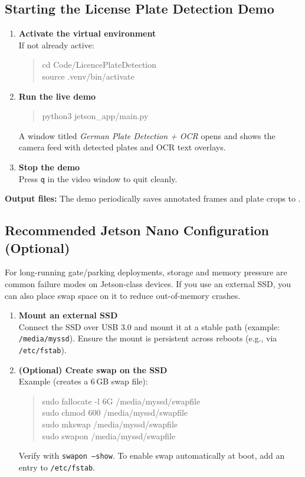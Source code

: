 \documentclass[11pt,a4paper]{article}
\begin{document}
\subsection{Starting the License Plate Detection Demo}
\begin{enumerate}
    \item \textbf{Activate the virtual environment}\\
    If not already active:
    \begin{quote}\ttfamily
    cd Code/LicencePlateDetection\\
    source .venv/bin/activate
    \end{quote}

    \item \textbf{Run the live demo}\\
    \begin{quote}\ttfamily
    python3 jetson\_app/main.py
    \end{quote}
    A window titled \textit{German Plate Detection + OCR} opens and shows the camera feed with detected plates and OCR text overlays.

    \item \textbf{Stop the demo}\\
    Press \texttt{q} in the video window to quit cleanly.
\end{enumerate}

\textbf{Output files:} The demo periodically saves annotated frames and plate crops to .

\subsection{Recommended Jetson Nano Configuration (Optional)}
For long-running gate/parking deployments, storage and memory pressure are common failure modes on Jetson-class devices.
If you use an external SSD, you can also place swap space on it to reduce out-of-memory crashes.

\begin{enumerate}
    \item \textbf{Mount an external SSD}\\
    Connect the SSD over USB 3.0 and mount it at a stable path (example: \texttt{/media/myssd}).
    Ensure the mount is persistent across reboots (e.g., via \texttt{/etc/fstab}).

    \item \textbf{(Optional) Create swap on the SSD}\\
    Example (creates a 6\,GB swap file):
    \begin{quote}\ttfamily
    sudo fallocate -l 6G /media/myssd/swapfile\\
    sudo chmod 600 /media/myssd/swapfile\\
    sudo mkswap /media/myssd/swapfile\\
    sudo swapon /media/myssd/swapfile
    \end{quote}
    Verify with \texttt{swapon --show}. To enable swap automatically at boot, add an entry to \texttt{/etc/fstab}.
\end{enumerate}
\end{document}
